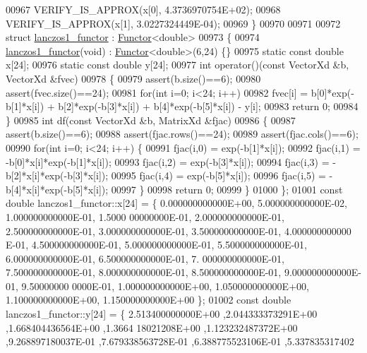 \begin{DoxyCode}
00967   VERIFY\_IS\_APPROX(x[0], 4.3736970754E+02);
00968   VERIFY\_IS\_APPROX(x[1], 3.0227324449E-04);
00969 \}
00970 
00971 
00972 \textcolor{keyword}{struct }\hyperlink{structlanczos1__functor}{lanczos1\_functor} : \hyperlink{struct_functor}{Functor}<double>
00973 \{
00974     \hyperlink{structlanczos1__functor}{lanczos1\_functor}(\textcolor{keywordtype}{void}) : \hyperlink{struct_functor}{Functor}<double>(6,24) \{\}
00975     \textcolor{keyword}{static} \textcolor{keyword}{const} \textcolor{keywordtype}{double} x[24];
00976     \textcolor{keyword}{static} \textcolor{keyword}{const} \textcolor{keywordtype}{double} y[24];
00977     \textcolor{keywordtype}{int} operator()(\textcolor{keyword}{const} VectorXd &b, VectorXd &fvec)
00978     \{
00979         assert(b.size()==6);
00980         assert(fvec.size()==24);
00981         \textcolor{keywordflow}{for}(\textcolor{keywordtype}{int} i=0; i<24; i++)
00982             fvec[i] = b[0]*exp(-b[1]*x[i]) + b[2]*exp(-b[3]*x[i]) + b[4]*exp(-b[5]*x[i])  - y[i];
00983         \textcolor{keywordflow}{return} 0;
00984     \}
00985     \textcolor{keywordtype}{int} df(\textcolor{keyword}{const} VectorXd &b, MatrixXd &fjac)
00986     \{
00987         assert(b.size()==6);
00988         assert(fjac.rows()==24);
00989         assert(fjac.cols()==6);
00990         \textcolor{keywordflow}{for}(\textcolor{keywordtype}{int} i=0; i<24; i++) \{
00991             fjac(i,0) = exp(-b[1]*x[i]);
00992             fjac(i,1) = -b[0]*x[i]*exp(-b[1]*x[i]);
00993             fjac(i,2) = exp(-b[3]*x[i]);
00994             fjac(i,3) = -b[2]*x[i]*exp(-b[3]*x[i]);
00995             fjac(i,4) = exp(-b[5]*x[i]);
00996             fjac(i,5) = -b[4]*x[i]*exp(-b[5]*x[i]);
00997         \}
00998         \textcolor{keywordflow}{return} 0;
00999     \}
01000 \};
01001 \textcolor{keyword}{const} \textcolor{keywordtype}{double} lanczos1\_functor::x[24] = \{ 0.000000000000E+00, 5.000000000000E-02, 1.000000000000E-01, 1.5000
      00000000E-01, 2.000000000000E-01, 2.500000000000E-01, 3.000000000000E-01, 3.500000000000E-01, 4.000000000000
      E-01, 4.500000000000E-01, 5.000000000000E-01, 5.500000000000E-01, 6.000000000000E-01, 6.500000000000E-01, 7.
      000000000000E-01, 7.500000000000E-01, 8.000000000000E-01, 8.500000000000E-01, 9.000000000000E-01, 9.50000000
      0000E-01, 1.000000000000E+00, 1.050000000000E+00, 1.100000000000E+00, 1.150000000000E+00 \};
01002 \textcolor{keyword}{const} \textcolor{keywordtype}{double} lanczos1\_functor::y[24] = \{ 2.513400000000E+00 ,2.044333373291E+00 ,1.668404436564E+00 ,1.3664
      18021208E+00 ,1.123232487372E+00 ,9.268897180037E-01 ,7.679338563728E-01 ,6.388775523106E-01 ,5.337835317402

\end{DoxyCode}
